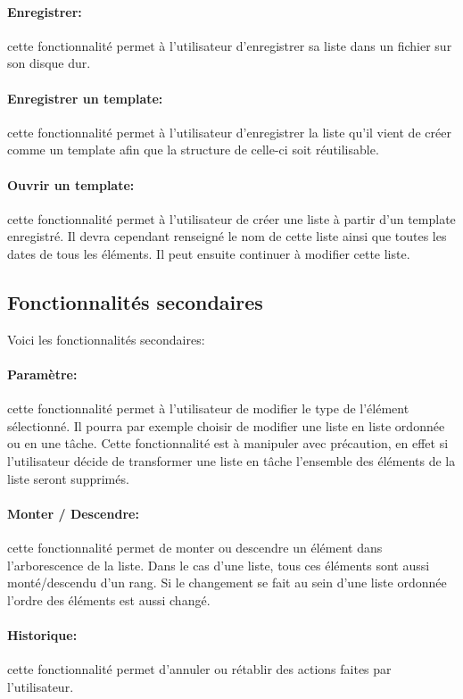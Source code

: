 \documentclass[a4paper,10pt]{article}
\begin{document}
\paragraph{Enregistrer:} cette fonctionnalité permet à l'utilisateur d'enregistrer sa liste dans un fichier sur son disque dur.
\paragraph{Enregistrer un template:} cette fonctionnalité permet à l'utilisateur d'enregistrer la liste qu'il vient de créer comme un template afin que la structure de celle-ci soit réutilisable.
\paragraph{Ouvrir un template:} cette fonctionnalité permet à l'utilisateur de créer une liste à partir d'un template enregistré. Il devra cependant renseigné le nom de cette liste ainsi que toutes les dates de tous les éléments. Il peut ensuite continuer à modifier cette liste.

\subsection{Fonctionnalités secondaires}
Voici les fonctionnalités secondaires:
\paragraph{Paramètre:} cette fonctionnalité permet à l'utilisateur de modifier le type de l'élément sélectionné. Il pourra par exemple choisir de modifier une liste en liste ordonnée ou en une tâche. Cette fonctionnalité est à manipuler avec précaution, en effet si l'utilisateur décide de transformer une liste en tâche l'ensemble des éléments de la liste seront supprimés.
\paragraph{Monter / Descendre:} cette fonctionnalité permet de monter ou descendre un élément dans l'arborescence de la liste. Dans le cas d'une liste, tous ces éléments sont aussi monté/descendu d'un rang. Si le changement se fait au sein d'une liste ordonnée l'ordre des éléments est aussi changé.
\paragraph{Historique:} cette fonctionnalité permet d'annuler ou rétablir des actions faites par l'utilisateur.
\end{document}
